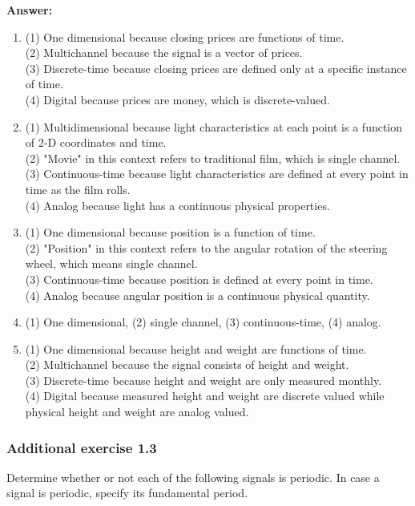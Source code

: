 \documentclass[12pt,a4paper]{article}
\begin{document}
\noindent\textbf{Answer:}
\begin{enumerate}[label=\textbf{(\alph*)}, leftmargin=*]
    \item (1) One dimensional because closing prices are functions of time.\\
    (2) Multichannel because the signal is a vector of prices.\\
    (3) Discrete-time because closing prices are defined only at a specific instance of time.\\
    (4) Digital because prices are money, which is discrete-valued.
    \item (1) Multidimensional because light characteristics at each point is a function of 2-D coordinates and time.\\
    (2) "Movie" in this context refers to traditional film, which is single channel.\\
    (3) Continuous-time because light characteristics are defined at every point in time as the film rolls.\\
    (4) Analog because light has a continuous physical properties.
    \item (1) One dimensional because position is a function of time.\\
    (2) "Position" in this context refers to the angular rotation of the steering wheel, which means single channel.\\
    (3) Continuous-time because position is defined at every point in time.\\
    (4) Analog because angular position is a continuous physical quantity.
    \item (1) One dimensional, (2) single channel, (3) continuous-time, (4) analog.
    \item (1) One dimensional because height and weight are functions of time.\\
    (2) Multichannel because the signal consists of height and weight.\\
    (3) Discrete-time because height and weight are only measured monthly.\\
    (4) Digital because measured height and weight are discrete valued while physical height and weight are analog valued.
\end{enumerate}

\subsubsection*{Additional exercise 1.3}
\noindent
Determine whether or not each of the following signals is periodic. In case a signal is periodic, specify its fundamental period.
\end{document}
